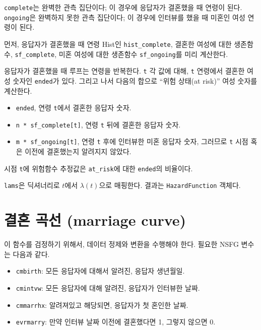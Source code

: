 {\tt complete}는 완벽한 관측 집단이다; 이 경우에 응답자가 결혼했을 때 연령이 된다. {\tt ongoing}은 완벽하지 못한 관측 집단이다; 이 경우에 인터뷰를 했을 때 미혼인 여성 연령이 된다.

먼저, 응답자가 결혼했을 때 연령 Hist인 \verb"hist_complete",
결혼한 여성에 대한 생존함수, \verb"sf_complete", 미혼 여성에 대한 생존함수 \verb"sf_ongoing"를 미리 계산한다.

응답자가 결혼했을 때 루프는 연령을 반복한다. 
{\tt t} 각 값에 대해, {\tt t} 연령에서 결혼한 여성 숫자인 {\tt ended}가 있다. 그리고 나서 다음의 합으로 ``위험 상태(at risk)'' 여성 숫자를 계산한다.

\begin{itemize}

\item {\tt ended}, 연령 {\tt t}에서 결혼한 응답자 숫자.

\item \verb"n * sf_complete[t]", 연령 {\tt t} 뒤에 결혼한 응답자 숫자.

\item \verb"m * sf_ongoing[t]", 연령 {\tt t} 후에 인터뷰한 미혼 응답자 숫자, 그러므로 {\tt t} 시점 혹은 이전에 결혼했는지 알려지지 않았다.

\end{itemize}

시점 {\tt t}에 위험함수 추정값은 \verb"at_risk"에 대한 {\tt ended}의 비율이다.

{\tt lams}은 딕셔너리로 $t$에서 $\lambda(t)$으로 매핑한다. 
결과는 {\tt HazardFunction} 객체다.


\section{결혼 곡선 (marriage curve)}

이 함수를 검정하기 위해서, 데이터 정제와 변환을 수행해야 한다.
필요한 NSFG 변수는 다음과 같다.


\begin{itemize}

\item {\tt cmbirth}: 모든 응답자에 대해서 알려진, 응답자 생년월일.

\item {\tt cmintvw}: 모든 응답자에 대해 알려진, 응답자가 인터뷰한 날짜.

\item {\tt cmmarrhx}: 알려져있고 해당되면, 응답자가 첫 혼인한 날짜.

\item {\tt evrmarry}: 만약 인터뷰 날짜 이전에 결혼했다면 1, 그렇지 않으면 0.

\end{itemize}

